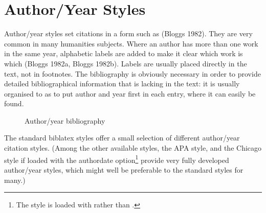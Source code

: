 \section{Author/Year Styles}

Author/year styles set citations in a form such as (Bloggs 1982). They
are very common in many humanities subjects. Where an author has more
than one work in the same year, alphabetic labels are added to make it
clear which work is which (Bloggs 1982a, Bloggs 1982b). Labels are
usually placed directly in the text, not in footnotes. The
bibliography is obviously necessary in order to provide detailed
bibliographical information that is lacking in the text: it is usually
organised to as to put author and year first in each entry, where it
can easily be found.

\begin{figure}
\caption{Author/year bibliography\label{example:bibliography:authoryear}}
\end{figure}

The standard biblatex styles offer a small selection of different
author/year citation styles. (Among the other available styles, the
APA style, and the Chicago style if loaded with the authordate
option\footnote{The  style is loaded with
   rather than
  .} provide very fully
developed author/year styles, which might well be preferable to the
standard styles for many.)

